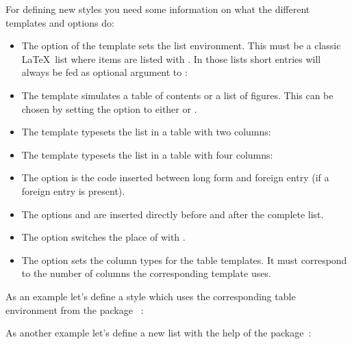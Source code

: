 \documentclass{acro-manual}
\begin{document}
For defining new styles you need some information on what the different
templates and options do:
\begin{itemize}
  \item The option  of the  template sets the list
    environment.  This must be a classic \LaTeX\ list where items are listed
    with .  In those lists short entries will always be fed as
    optional argument to : \\
  \item The template  simulates a table of contents or a list of
    figures.  This can be chosen by setting the option  to either
     or .
  \item The template  typesets the list in a table with two
    columns: \\
  \item The template  typesets the list in a table with four
    columns: \\
  \item The option  is the code inserted between long form
    and foreign entry (if a foreign entry is present).
  \item The options  and  are inserted directly
    before and after the complete list.
  \item The option  switches the place of  with
    .
  \item The option  sets the column types for the table
    templates.  It must correspond to the number of columns the corresponding
    template uses.
\end{itemize}

As an example let's define a style  which uses the corresponding
table environment from the package ~\cite{pkg:tabu}:

\begin{sourcecode}
  \usepackage{tabu,longtable}
\end{sourcecode}

As another example let's define a new list with the help of the 
package~\cite{pkg:enumitem}:
\end{document}
